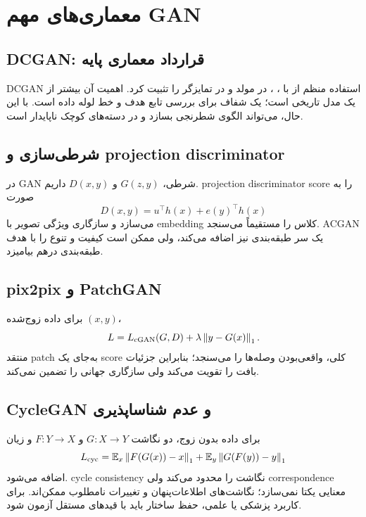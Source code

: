 \documentclass[12pt,openany,oneside]{book}
\newcommand{\E}{\mathbb{E}}
\newcommand{\norm}[1]{\left\lVert #1\right\rVert}
\begin{document}
\section{معماری‌های مهم GAN}
\subsection{DCGAN: قرارداد معماری پایه}
DCGAN استفاده منظم از  با ، ،  در مولد و  در تمایزگر را تثبیت کرد. اهمیت آن
بیشتر از یک مدل تاریخی است؛ یک  شفاف برای بررسی تابع هدف و خط لوله داده است. با این حال،  می‌تواند
الگوی شطرنجی بسازد و  در دسته‌های کوچک ناپایدار است.

\subsection{شرطی‌سازی و projection discriminator}
در GAN شرطی، $G(z,y)$ و $D(x,y)$ داریم. projection discriminator score را به صورت
\begin{equation}
 D(x,y)=u^\top h(x)+e(y)^\top h(x)
\end{equation}
می‌سازد و سازگاری ویژگی تصویر با embedding کلاس را مستقیماً می‌سنجد. ACGAN یک سر طبقه‌بندی نیز اضافه می‌کند، ولی ممکن است
کیفیت و تنوع را با هدف طبقه‌بندی درهم بیامیزد.

\subsection{pix2pix و PatchGAN}
برای داده زوج‌شده $(x,y)$،
\begin{equation}
 L=L_{\rm cGAN}(G,D)+\lambda\norm{y-G(x)}_1.
\end{equation}
منتقد patch به‌جای یک score کلی، واقعی‌بودن وصله‌ها را می‌سنجد؛ بنابراین جزئیات بافت را تقویت می‌کند ولی سازگاری جهانی را تضمین نمی‌کند.

\subsection{CycleGAN و عدم شناساپذیری}
برای داده بدون زوج، دو نگاشت $G:X\to Y$ و $F:Y\to X$ و زیان
\begin{equation}
 L_{\rm cyc}=\E_x\norm{F(G(x))-x}_1+\E_y\norm{G(F(y))-y}_1
\end{equation}
اضافه می‌شود. cycle consistency نگاشت را محدود می‌کند ولی correspondence معنایی یکتا نمی‌سازد؛ نگاشت‌های اطلاعات‌پنهان و تغییرات نامطلوب
ممکن‌اند. برای کاربرد پزشکی یا علمی، حفظ ساختار باید با قیدهای مستقل آزمون شود.
\end{document}
